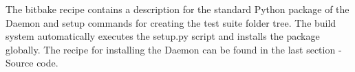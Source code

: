 The bitbake recipe contains a description for the standard Python package of the Daemon and setup commands for creating the test suite folder tree. The build system automatically executes the setup.py script and installs the package globally. The recipe for installing the Daemon can be found in the last section - Source code.


